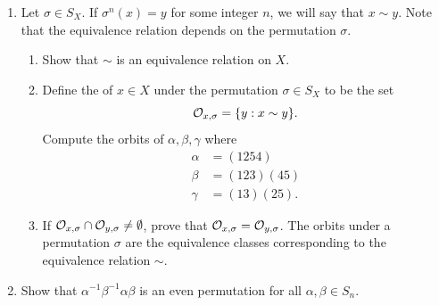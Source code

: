 \begin{enumerate}
 
 
\item
Let $\sigma \in S_X$. If $\sigma^n(x) = y$ for some integer $n$, we will say that $x \sim
y$. Note that the equivalence relation depends on the permutation $\sigma$.
\begin{enumerate}
 
 \item
Show that $\sim$ is an equivalence relation on $X$.
 
\item
Define the  of $x \in X$ under the permutation $\sigma \in
S_X$ to be the set 
\[
{\cal O}_{x, \sigma} = \{ y : x \sim y  \}.
\]
Compute the orbits of $\alpha, \beta, \gamma$ where
\begin{align*}
\alpha & = (1254) \\
\beta & = (123)(45)\\
\gamma & = (13)(25).
\end{align*}
 
 \item
If ${\cal O}_{x, \sigma} \cap {\cal O}_{y, \sigma} \neq \emptyset$,
prove that ${\cal O}_{x, \sigma} = {\cal O}_{y, \sigma}$.  The orbits
under a permutation $\sigma$ are the equivalence classes corresponding
to the equivalence relation $\sim$.
 
 
 
 
\end{enumerate}
 
 
\item
Show that  $\alpha^{-1} \beta^{-1} \alpha \beta$ is an even permutation for all $\alpha,
\beta \in S_n$. 
 
\end{enumerate}

